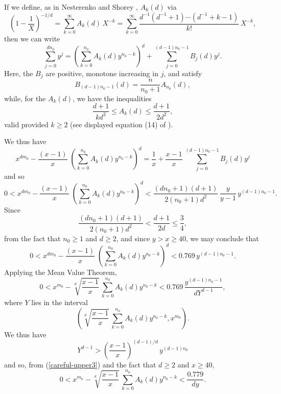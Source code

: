 If we define, as in Nesterenko and Shorey \cite{NeSh},  $A_k (d)$ via
 $$
  \left( 1 - \frac{1}{X} \right)^{-1/d} = \sum_{k=0}^\infty A_k (d) \, X^{-k} = \sum_{k=0}^\infty
  \frac{d^{-1} ( d^{-1}+1) \cdots (d^{-1} + k-1)}{k!} \, X^{-k},
 $$
 then we can write 
 $$
 \sum_{j=0}^{dn_0} y^j = \left( \sum_{k = 0}^{n_0} A_k (d) y^{n_0-k} \right)^d + \sum_{j=0}^{(d-1)n_0-1} B_j(d) y^j.
 $$
Here, the $B_j$ are positive, monotone increasing in $j$, and satisfy
 $$
 B_{(d-1)n_0-1} (d) = \frac{n}{n_0+1} A_{n_0} (d),
 $$
 while, for the $A_k(d)$, we have the inequalities
 $$
 \frac{d+1}{k d^2} \leq A_k (d) \leq  \frac{d+1}{2 d^2},
 $$
valid  provided $k \geq 2$ (see displayed equation (14) of \cite{NeSh}). 
 
 We thus have
\begin{equation} \label{careful}
 x^{d m_0} -  \frac{(x-1)}{x} \; \left( \sum_{k = 0}^{n_0} A_k (d) y^{n_0-k} \right)^d = \frac{1}{x} + \frac{x-1}{x} \, \sum_{j=0}^{(d-1)n_0-1} B_j(d) y^j
 \end{equation}
 and so
 \begin{equation} \label{careful-upper}
 0 <  x^{d m_0} -  \frac{(x-1)}{x} \; \left( \sum_{k = 0}^{n_0} A_k (d) y^{n_0-k} \right)^d <  \frac{(dn_0+1)(d+1)}{2 (n_0+1) d^2} \, \frac{y}{y-1} \, y^{(d-1) n_0-1}.
 \end{equation}
 Since
 $$
 \frac{(dn_0+1)(d+1)}{2 (n_0+1) d^2} < \frac{d+1}{2d} \leq \frac{3}{4},
 $$
from the fact that $n_0 \geq 1$ and $d \geq 2$, and since $y > x \geq 40$, we may conclude that
  \begin{equation} \label{careful-upper2}
 0 <  x^{d m_0} -  \frac{(x-1)}{x} \; \left( \sum_{k = 0}^{n_0} A_k (d) y^{n_0-k} \right)^d < 0.769 \, y^{(d-1) n_0-1}.
 \end{equation}
 Applying the Mean Value Theorem,
  \begin{equation} \label{careful-upper3}
 0 <   x^{m_0} -  \sqrt[d]{\frac{x-1}{x}} \, \sum_{k = 0}^{n_0} A_k (d) y^{n_0-k}  <  0.769 \,  \frac{y^{(d-1) n_0-1}}{d Y^{d-1}},
  \end{equation}
  where $Y$ lies in the interval
  $$
  \left( \sqrt[d]{\frac{x-1}{x}} \, \sum_{k = 0}^{n_0} A_k (d) y^{n_0-k}, x^{m_0} \right).
  $$
 We thus have
 $$
 Y^{d-1} >  \left( \frac{x-1}{x} \right)^{(d-1)/d} \, y^{(d-1) n_0}
 $$
 and so, from (\ref{careful-upper3}) and the fact that $d \geq 2$ and $x \geq 40$, 
   \begin{equation} \label{careful-upper4}
 0 <   x^{m_0} -  \sqrt[d]{\frac{x-1}{x}} \, \sum_{k = 0}^{n_0} A_k (d) y^{n_0-k}  <  \frac{0.779}{d y}.
  \end{equation}
  
